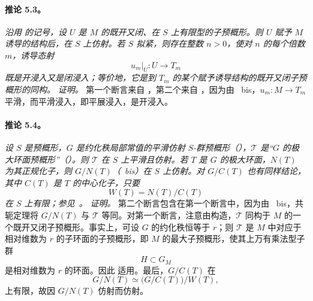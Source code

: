 \paragraph{\textbf{推论 5.3。}}
\emph{沿用  的记号，设 \(U\) 是 \(M\) 的既开又闭、在 \(S\) 上有限型的子预概形。则 \(U\) 赋予 \(M\) 诱导的结构后，在 \(S\) 上仿射。若 \(S\) 拟紧，则存在整数 \(n>0\)，使对 \(n\) 的每个倍数 \(m\)，诱导态射
\[
  u_m|_U:U\longrightarrow T_m
\]
既是开浸入又是闭浸入；等价地，它是到 \(T_m\) 的某个赋予诱导结构的既开又闭子预概形的同构。}
\emph{证明。}
第一个断言来自 ，第二个来自 ，因为由 ~bis，\(u_m:M\to T_m\) 平滑，而平滑浸入，即平展浸入，是开浸入。
\paragraph{\textbf{推论 5.4。}}
\emph{设 \(S\) 是预概形，\(G\) 是约化秩局部常值的平滑仿射 \(S\)-群预概形\textup{（）}，\(\mathcal T\) 是“\(G\) 的极大环面预概形”\textup{（）}。则 \(\mathcal T\) 在 \(S\) 上平滑且仿射。若 \(T\) 是 \(G\) 的极大环面，\(N(T)\) 为其正规化子，则 \(G/N(T)\)\textup{（~bis）}在 \(S\) 上仿射。对 \(G/C(T)\) 也有同样结论，其中 \(C(T)\) 是 \(T\) 的中心化子，只要
\[
  W(T)=N(T)/C(T)
\]
在 \(S\) 上有限；参见\ 。}
\emph{证明。}
第二个断言包含在第一个断言中，因为由 ~bis，共轭定理将 \(G/N(T)\) 与 \(\mathcal T\) 等同。对第一个断言，注意由构造，\(\mathcal T\) 同构于 \(M\) 的一个既开又闭子预概形。事实上，可设 \(G\) 的约化秩恒等于 \(r\)；则 \(\mathcal T\) 是 \(M\) 中对应于相对维数为 \(r\) 的子环面的子预概形，即 \(M\) 的最大子预概形，使其上万有乘法型子群
\[
  H\subset G_M
\]
是相对维数为 \(r\) 的环面。因此 适用。最后，\(G/C(T)\) 在
\[
  G/N(T)\simeq \bigl(G/C(T)\bigr)/W(T),
\]
上有限，故因 \(G/N(T)\) 仿射而仿射。
